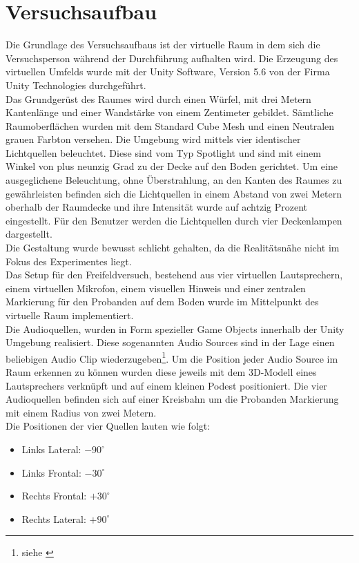 
\section{Versuchsaufbau}
Die Grundlage des Versuchsaufbaus ist der virtuelle Raum in dem sich die Versuchsperson während der Durchführung aufhalten wird. Die Erzeugung des virtuellen Umfelds wurde mit der Unity Software, Version 5.6 von der Firma Unity Technologies durchgeführt.\\%
Das Grundgerüst des Raumes wird durch einen Würfel, mit drei Metern Kantenlänge und einer Wandstärke von einem Zentimeter gebildet. Sämtliche Raumoberflächen wurden mit dem Standard Cube Mesh und einen Neutralen grauen Farbton versehen. Die Umgebung wird mittels vier identischer Lichtquellen beleuchtet. Diese sind vom Typ Spotlight und sind mit einem Winkel von plus neunzig Grad zu der Decke auf den Boden gerichtet. Um eine ausgeglichene Beleuchtung, ohne Überstrahlung, an den Kanten des Raumes zu gewährleisten befinden sich die Lichtquellen in einem Abstand von zwei Metern oberhalb der Raumdecke und ihre Intensität wurde auf achtzig Prozent eingestellt. Für den Benutzer werden die Lichtquellen durch vier Deckenlampen dargestellt.\\
Die Gestaltung wurde bewusst schlicht gehalten, da die Realitätsnähe nicht im Fokus des Experimentes liegt.\\
Das Setup für den Freifeldversuch, bestehend aus vier virtuellen Lautsprechern, einem virtuellen Mikrofon, einem visuellen Hinweis und einer zentralen Markierung für den Probanden auf dem Boden wurde im Mittelpunkt des virtuelle Raum implementiert.\\
Die Audioquellen, wurden in Form spezieller Game Objects innerhalb der Unity Umgebung realisiert. Diese sogenannten Audio Sources sind in der Lage einen beliebigen Audio Clip wiederzugeben\footnote{siehe \cite{UnityManualAudioSource}}.%
Um die Position jeder Audio Source im Raum erkennen zu können wurden diese jeweils mit dem 3D-Modell eines Lautsprechers verknüpft und auf einem kleinen Podest positioniert. Die vier Audioquellen befinden sich auf einer Kreisbahn um die Probanden Markierung mit einem Radius von zwei Metern.\\
Die Positionen der vier Quellen lauten wie folgt:
\begin{itemize}
\item Links Lateral: $-90^{\circ}$
\item Links Frontal: $-30^{\circ}$
\item Rechts Frontal: $+30^{\circ}$
\item Rechts Lateral: $+90^{\circ}$
\end{itemize}
